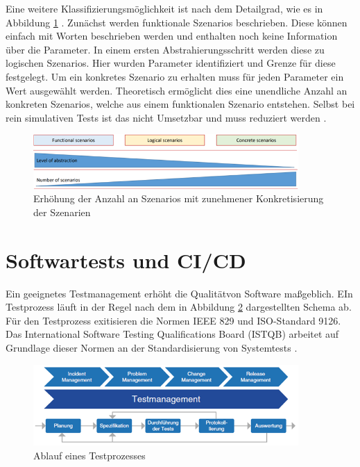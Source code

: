 Eine weitere Klassifizierungsmöglichkeit ist nach dem Detailgrad, wie es in Abbildung \ref{fig:scenario_level} \cite{Nalic2020}\cite{menzel2018scenarios}. Zunächst werden funktionale Szenarios beschrieben. Diese können einfach mit Worten beschrieben werden und enthalten noch keine Information über die Parameter. In einem ersten Abstrahierungsschritt werden diese zu logischen Szenarios. Hier wurden Parameter identifiziert und Grenze für diese festgelegt. Um ein konkretes Szenario zu erhalten muss für jeden Parameter ein Wert ausgewählt werden. Theoretisch ermöglicht dies eine unendliche Anzahl an konkreten Szenarios, welche aus einem funktionalen Szenario entstehen. Selbst bei rein simulativen Tests ist das nicht Umsetzbar und muss reduziert werden \cite{menzel2018scenarios}.
\begin{figure}[H]
    \centering
    \includegraphics[width=0.9\textwidth]{figures/2_Grundlagen/scenario_level.png}
    \caption{Erhöhung der Anzahl an Szenarios mit zunehmener Konkretisierung der Szenarien \cite{menzel2018scenarios}}
    \label{fig:scenario_level}
\end{figure}

\section{Softwartests und CI/CD} \label{sec:CICD}

Ein geeignetes Testmanagement erhöht die Qualitätvon Software maßgeblich. EIn Testprozess läuft in der Regel nach dem in Abbildung \ref{fig:testprozess} dargestellten Schema ab. Für den Testprozess exitisieren die Normen IEEE 829 und ISO-Standard 9126. Das International Software Testing Qualifications Board (ISTQB) arbeitet auf Grundlage dieser Normen an der Standardisierung von Systemtests \cite{witte2019testmanagement}.
\begin{figure}
    \centering
    \includegraphics[width=0.9\textwidth]{figures/2_Grundlagen/testprozess.png}
    \caption{Ablauf eines Testprozesses \cite{witte2019testmanagement}}
    \label{fig:testprozess}
\end{figure}


